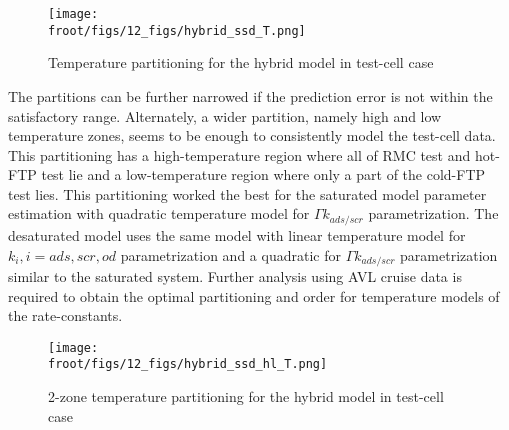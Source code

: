 \begin{figure}[H]
        \centering
        \texttt{[image: \\froot/figs/12\_figs/hybrid\_ssd\_T.png]}
        \caption{Temperature partitioning for the hybrid model in test-cell case}
\end{figure}

The partitions can be further narrowed if the prediction error is not within the satisfactory range. Alternately, a
wider partition, namely high and low temperature zones, seems to be enough to consistently model the test-cell data.
This partitioning has a high-temperature region where all of RMC test and hot-FTP test lie and a low-temperature region
where only a part of the cold-FTP test lies. This partitioning worked the best for the saturated model parameter
estimation with quadratic temperature model for $\Gamma k_{ads/scr}$ parametrization. The desaturated model uses the
same model with linear temperature model for $k_i, i=ads, scr, od$ parametrization and a quadratic for $\Gamma
k_{ads/scr}$ parametrization similar to the saturated system. Further analysis using AVL cruise data is required to
obtain the optimal partitioning and order for temperature models of the rate-constants.

\begin{figure}[H]
        \centering
        \texttt{[image: \\froot/figs/12\_figs/hybrid\_ssd\_hl\_T.png]}
        \caption{2-zone temperature partitioning for the hybrid model in test-cell case}
\end{figure}
